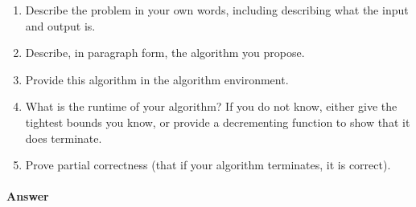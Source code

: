 \documentclass{article}
\begin{document}
\begin{enumerate}
    \item Describe the problem in your own words, including describing what the input and output is.
    \item Describe, in paragraph form, the algorithm you propose.
    \item Provide this algorithm in the algorithm environment.
    \item What is the runtime of your algorithm? If you do not know, either give the tightest bounds you know, or provide a decrementing function to show that it does terminate.
    \item Prove partial correctness (that if your algorithm terminates, it is correct).
\end{enumerate}

\paragraph{Answer}

\end{document}
